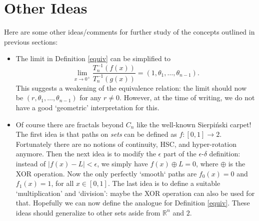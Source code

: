 \documentclass{article}
\theoremstyle{plain}
\begin{document}
\section{Other Ideas}
Here are some other ideas/comments for further study of the concepts outlined in previous sections:
\begin{itemize}
	\item The limit in Definition \ref{equiv} can be simplified to $$\lim_{x \rightarrow 0^+}\frac{T_n^{-1}(f(x))}{T_n^{-1}(g(x))} = (1, \theta_1, \ldots, \theta_{n-1}).$$ This suggests a weakening of the equivalence relation: the limit should now be $(r, \theta_1, \ldots, \theta_{n-1})$ for any $r \ne 0$. However, at the time of writing, we do not have a good `geometric' interpretation for this.
	\item Of course there are fractals beyond $C_n$ like the well-known Sierpiński carpet! The first idea is that paths on \textit{sets} can be defined as $f:[0,1] \rightarrow 2$. Fortunately there are no notions of continuity, HSC, and hyper-rotation anymore. Then the next idea is to modify the $\epsilon$ part of the $\epsilon$-$\delta$ definition: instead of $|f(x)-L|<\epsilon$, we simply have $f(x) \oplus L = 0$, where $\oplus$ is the XOR operation. Now the only perfectly `smooth` paths are $f_0(x)=0$ and $f_1(x)=1$, for all $x\in[0,1]$. The last idea is to define a suitable `multiplication' and `division': maybe the XOR operation can also be used for that. Hopefully we can now define the analogue for Definition \ref{equiv}. These ideas should generalize to other sets aside from $\mathbb{R}^n$ and $2$.
\end{itemize}



\end{document}
